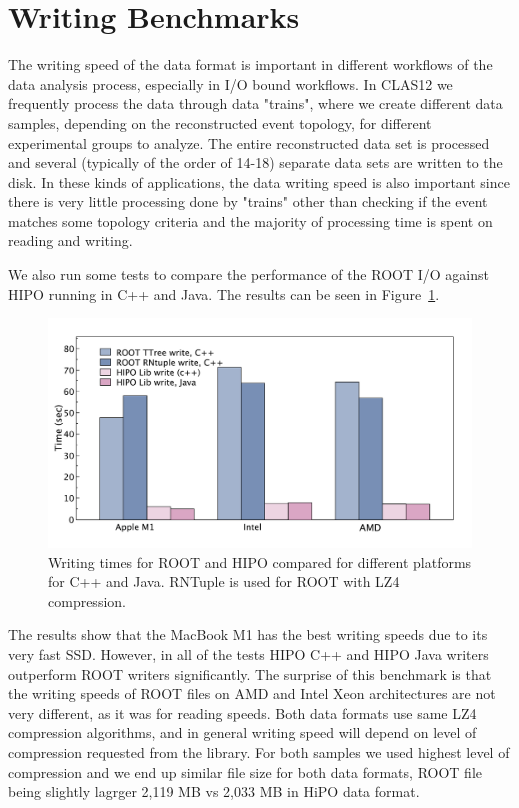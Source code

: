 \documentclass[preprint,12pt]{elsarticle}
\begin{document}
 \section{Writing Benchmarks}

The writing speed of the data format is important in different workflows of the data analysis process, especially in I/O bound workflows.
In CLAS12 we frequently process the data through data "trains", where we create different data samples, depending on the reconstructed event topology,
for different experimental groups to analyze. The entire reconstructed data set is processed and several (typically of the order of 14-18) separate data sets 
are written to the disk. In these kinds of applications, the data writing speed is also important since there is very little processing done by "trains" other
than checking if the event matches some topology criteria and the majority of processing time is spent on reading and writing.

We also run some tests to compare the performance of the ROOT I/O against HIPO running in C++ and Java. The results can be 
seen in Figure~\ref{benchmark:write}.

  \begin{figure}[!h]
\begin{center}
  \includegraphics[width=5.0in]{bench_root_vs_hipo_write.pdf}
 \caption { Writing times for ROOT and HIPO compared for different platforms for C++ and Java. RNTuple is used for ROOT with LZ4 compression.}
 \label{benchmark:write}
 \end{center}
  \end{figure}
  
The results show that the MacBook M1 has the best writing speeds due to its very fast SSD. However, in all of the tests
HIPO C++ and HIPO Java writers outperform ROOT writers significantly. The surprise of this benchmark is that the writing 
speeds of ROOT files on AMD and Intel Xeon architectures are not very different, as it was for reading speeds.
Both data formats use same LZ4 compression algorithms, and in general writing speed will depend on level of compression requested from the  library. For both samples we used highest level of compression and we end up similar file size for both data formats, ROOT file being slightly lagrger 2,119 MB vs 2,033 MB in HiPO data format. 
\end{document}
